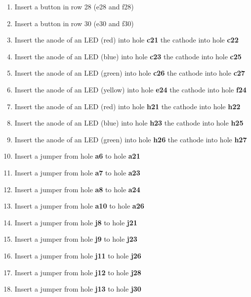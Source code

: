\begin{enumerate}
	\item Insert a button in row 28 (e28 and f28)
	\item Insert a button in row 30 (e30 and f30)
	
	\item Insert the anode of an LED (red) into hole \textbf{c21} the cathode into hole \textbf{c22}
	\item Insert the anode of an LED (blue) into hole \textbf{c23} the cathode into hole \textbf{c25}
	\item Insert the anode of an LED (green) into hole \textbf{c26} the cathode into hole \textbf{c27}
	
	\item Insert the anode of an LED (yellow) into hole \textbf{e24} the cathode into hole \textbf{f24}
	
	\item Insert the anode of an LED (red) into hole \textbf{h21} the cathode into hole \textbf{h22}
	\item Insert the anode of an LED (blue) into hole \textbf{h23} the cathode into hole \textbf{h25}
	\item Insert the anode of an LED (green) into hole \textbf{h26} the cathode into hole \textbf{h27}

	\item Insert a jumper from hole \textbf{a6} to hole \textbf{a21}
	\item Insert a jumper from hole \textbf{a7} to hole \textbf{a23}
	\item Insert a jumper from hole \textbf{a8} to hole \textbf{a24}
		
	\item Insert a jumper from hole \textbf{a10} to hole \textbf{a26}

	\item Insert a jumper from hole \textbf{j8} to hole \textbf{j21}
	\item Insert a jumper from hole \textbf{j9} to hole \textbf{j23}
	\item Insert a jumper from hole \textbf{j11} to hole \textbf{j26}
	
	\item Insert a jumper from hole \textbf{j12} to hole \textbf{j28}
	\item Insert a jumper from hole \textbf{j13} to hole \textbf{j30}
	

\end{enumerate}
